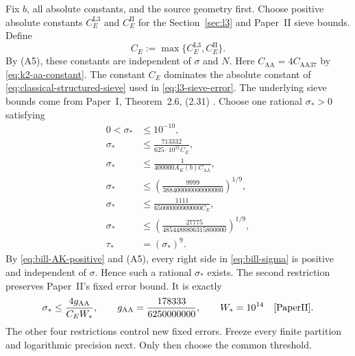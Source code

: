 Fix $b$, all absolute constants, and the source geometry first.
Choose positive absolute constants $C_E^{\mathrm{L3}}$ and
$C_E^{\mathrm{II}}$ for the Section~\ref{sec:l3} and Paper~II sieve bounds. Define
\begin{equation}\label{eq:bill-CE-definition}
 C_E:=\max\{C_E^{\mathrm{L3}},C_E^{\mathrm{II}}\}.
\end{equation}
By \textup{(A5)}, these constants are independent of $\sigma$ and $N$.
Here $C_{\mathrm{AA}}=4C_{\mathrm{AA37}}$ by \eqref{eq:k2-aa-constant}. The
constant $C_E$ dominates the absolute constant of
\eqref{eq:classical-structured-sieve} used in \eqref{eq:l3-sieve-error}.
The underlying sieve bounds come from Paper~I, Theorem~2.6, (2.31)
\cite[Theorem~2.6, (2.31)]{PaperI}.
Choose one rational $\sigma_*>0$ satisfying
\begin{equation}\label{eq:bill-sigma}
\begin{aligned}
 0<\sigma_*&\le 10^{-10},\\
 \sigma_*&\le\frac{713332}{625\cdot10^{21}C_E},\\
 \sigma_*&\le\frac{1}{400000A_K(b)C_{\mathrm{AA}}},\\
 \sigma_*&\le\left(\frac{9999}{388400000000000000}\right)^{1/9},\\
 \sigma_*&\le\frac{1111}{65000000000000C_E},\\
 \sigma_*&\le\left(\frac{27775}{4854488806315800000}\right)^{1/9},\\
 \tau_*&=(\sigma_*)^9.
\end{aligned}
\end{equation}
By \eqref{eq:bill-AK-positive} and \textup{(A5)}, every right side in
\eqref{eq:bill-sigma} is positive and independent of $\sigma$.
Hence such a rational $\sigma_*$ exists.
The second restriction preserves Paper~II's fixed error bound.
It is exactly
\begin{equation}\label{eq:bill-paperII-AA}
 \sigma_*\le\frac{4g_{\mathrm{AA}}}{C_EW_*},\qquad
 g_{\mathrm{AA}}=\frac{178333}{6250000000},\qquad W_*=10^{14}
 \quad\text{\cite[(1.26), (1.27), (6.6)]{PaperII}}.
\end{equation}
The other four restrictions control new fixed errors.
Freeze every finite partition and logarithmic precision next.
Only then choose the common threshold.


